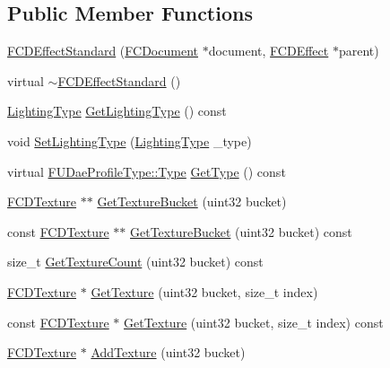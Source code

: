 \subsection*{Public Member Functions}
\begin{DoxyCompactItemize}
\item 
\hyperlink{classFCDEffectStandard_a3afc0b015bd0c80e7eae0c9ba7adb5a1}{FCDEffectStandard} (\hyperlink{classFCDocument}{FCDocument} $\ast$document, \hyperlink{classFCDEffect}{FCDEffect} $\ast$parent)
\item 
virtual \hyperlink{classFCDEffectStandard_a1579bf493f5dcfa5f8b45b46c4b346f5}{$\sim$FCDEffectStandard} ()
\item 
\hyperlink{classFCDEffectStandard_a0c8ec2fb06ea05212a4bb140f909b41d}{LightingType} \hyperlink{classFCDEffectStandard_a659241e4151186c1a2f59c3583b0035d}{GetLightingType} () const 
\item 
void \hyperlink{classFCDEffectStandard_a0f1e8305c58f97a4b191bfc62db0155e}{SetLightingType} (\hyperlink{classFCDEffectStandard_a0c8ec2fb06ea05212a4bb140f909b41d}{LightingType} \_\-type)
\item 
virtual \hyperlink{namespaceFUDaeProfileType_ac10ea253a7a141708de2324a929f8a79}{FUDaeProfileType::Type} \hyperlink{classFCDEffectStandard_a5870dbcf350bd3f15781cf9ccf1095f9}{GetType} () const 
\item 
\hyperlink{classFCDTexture}{FCDTexture} $\ast$$\ast$ \hyperlink{classFCDEffectStandard_a92773e450b4ac35adfb15516e90c147f}{GetTextureBucket} (uint32 bucket)
\item 
const \hyperlink{classFCDTexture}{FCDTexture} $\ast$$\ast$ \hyperlink{classFCDEffectStandard_a427f196e14042ccc111b9ffb35649c60}{GetTextureBucket} (uint32 bucket) const 
\item 
size\_\-t \hyperlink{classFCDEffectStandard_a81a864fa18e3c0ff42abf708c9fca9ff}{GetTextureCount} (uint32 bucket) const 
\item 
\hyperlink{classFCDTexture}{FCDTexture} $\ast$ \hyperlink{classFCDEffectStandard_a502f6539d10d624b0d9d22dbe5b6cd33}{GetTexture} (uint32 bucket, size\_\-t index)
\item 
const \hyperlink{classFCDTexture}{FCDTexture} $\ast$ \hyperlink{classFCDEffectStandard_adbcd3cc63dc1898ec1a370c104724468}{GetTexture} (uint32 bucket, size\_\-t index) const 
\item 
\hyperlink{classFCDTexture}{FCDTexture} $\ast$ \hyperlink{classFCDEffectStandard_a98e73c677f68753e9630f0c9a1c3947b}{AddTexture} (uint32 bucket)
\item 

\end{DoxyCompactItemize}
